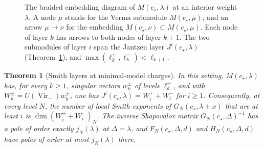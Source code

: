 \documentclass[twoside,10pt]{article}
\numberwithin{equation}{section}
\theoremstyle{slbody}
\newtheorem{theorem}{Theorem}[section]
\theoremstyle{definition}
\theoremstyle{remark}
\newcommand{\Vir}{\operatorname{Vir}}
\begin{document}
\begin{figure}[ht]
\centering
{}
\caption{The braided embedding diagram of \(M(c_\star,\lambda)\) at an
interior weight \(\lambda\).  A node \(\mu\) stands for the Verma submodule
\(M(c_\star,\mu)\), and an arrow \(\mu\to\nu\) for the embedding
\(M(c_\star,\nu)\subset M(c_\star,\mu)\).  Each node of layer \(k\) has arrows to
both nodes of layer \(k+1\).  The two submodules of layer \(i\) span the
Jantzen layer \(J^i(c_\star,\lambda)\) (Theorem~\ref{thm:jantzen-smith}), and
\(\max(\ell^+_k,\ell^-_k)<\ell_{k+1}\).}
\label{fig:braided}
\end{figure}

\begin{theorem}[Smith layers at minimal-model charges]
\label{thm:jantzen-smith}
In this setting, \(M(c_\star,\lambda)\) has, for every \(k\geq1\), singular
vectors \(w^\pm_k\) of levels \(\ell^\pm_k\), and with
\(W^\pm_k=U(\Vir_-)w^\pm_k\), one has
\(J^i(c_\star,\lambda)=W^+_i+W^-_i\) for \(i\geq1\).  Consequently, at every
level \(N\), the number of local Smith exponents of \(G_N(c_\star,\lambda+x)\)
that are at least \(i\) is \(\dim(W^+_i+W^-_i)_N\).  The inverse Shapovalov
matrix \(G_N(c_\star,\Delta)^{-1}\) has a pole of order exactly
\(j_N(\lambda)\) at \(\Delta=\lambda\), and \(F_N(c_\star,\Delta,d)\) and
\(H_N(c_\star,\Delta,d)\) have poles of order at most \(j_N(\lambda)\)
there.
\end{theorem}
\end{document}
